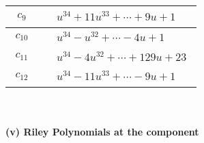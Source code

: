 \documentclass[1p]{elsarticle_modified}
\theoremstyle{definition}
\begin{document}
\begin{tabular}{m{50pt}|m{274pt}}
\hline $$\begin{aligned}c_{9}\end{aligned}$$&$\begin{aligned}
&u^{34}+11 u^{33}+\cdots+9 u+1
\end{aligned}$\\
\hline $$\begin{aligned}c_{10}\end{aligned}$$&$\begin{aligned}
&u^{34}- u^{32}+\cdots-4 u+1
\end{aligned}$\\
\hline $$\begin{aligned}c_{11}\end{aligned}$$&$\begin{aligned}
&u^{34}-4 u^{32}+\cdots+129 u+23
\end{aligned}$\\
\hline $$\begin{aligned}c_{12}\end{aligned}$$&$\begin{aligned}
&u^{34}-11 u^{33}+\cdots-9 u+1
\end{aligned}$\\
\hline
\end{tabular}\\~\\
\newpage\renewcommand{\arraystretch}{1}
\flushleft \textbf{(v) Riley Polynomials at the component}\newline \\
\end{document}
